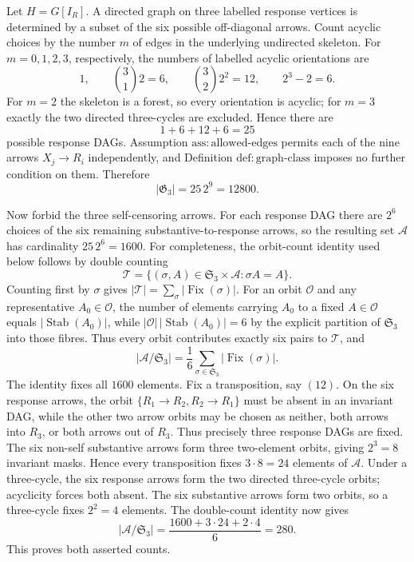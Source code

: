 Let \(H=G[I_R]\).  A directed graph on three labelled response vertices is determined by a subset of the six possible off-diagonal arrows.  Count acyclic choices by the number \(m\) of edges in the underlying undirected skeleton.  For \(m=0,1,2,3\), respectively, the numbers of labelled acyclic orientations are
\[
1,\qquad {3\choose1}2=6,\qquad {3\choose2}2^2=12,\qquad 2^3-2=6.
\]
For \(m=2\) the skeleton is a forest, so every orientation is acyclic; for \(m=3\) exactly the two directed three-cycles are excluded.  Hence there are
\[
1+6+12+6=25
\]
possible response DAGs.  Assumption \(\mathrm{ass{:}allowed\text{-}edges}\) permits each of the nine arrows \(X_j\to R_i\) independently, and Definition \(\mathrm{def{:}graph\text{-}class}\) imposes no further condition on them.  Therefore
\[
|\mathfrak G_3|=25\,2^9=12800.
\]

Now forbid the three self-censoring arrows.  For each response DAG there are \(2^6\) choices of the six remaining substantive-to-response arrows, so the resulting set \(\mathcal A\) has cardinality \(25\,2^6=1600\).  For completeness, the orbit-count identity used below follows by double counting
\[
\mathcal T=\{(\sigma,A)\in\mathfrak S_3\times\mathcal A:\sigma A=A\}.
\]
Counting first by \(\sigma\) gives \(|\mathcal T|=\sum_\sigma|\operatorname{Fix}(\sigma)|\).  For an orbit \(\mathcal O\) and any representative \(A_0\in\mathcal O\), the number of elements carrying \(A_0\) to a fixed \(A\in\mathcal O\) equals \(|\operatorname{Stab}(A_0)|\), while \(|\mathcal O|\,|\operatorname{Stab}(A_0)|=6\) by the explicit partition of \(\mathfrak S_3\) into those fibres.  Thus every orbit contributes exactly six pairs to \(\mathcal T\), and
\[
|\mathcal A/\mathfrak S_3|=\frac16\sum_{\sigma\in\mathfrak S_3}|\operatorname{Fix}(\sigma)|.
\]
The identity fixes all \(1600\) elements.  Fix a transposition, say \((12)\).  On the six response arrows, the orbit \(\{R_1\to R_2,R_2\to R_1\}\) must be absent in an invariant DAG, while the other two arrow orbits may be chosen as neither, both arrows into \(R_3\), or both arrows out of \(R_3\).  Thus precisely three response DAGs are fixed.  The six non-self substantive arrows form three two-element orbits, giving \(2^3=8\) invariant masks.  Hence every transposition fixes \(3\cdot8=24\) elements of \(\mathcal A\).  Under a three-cycle, the six response arrows form the two directed three-cycle orbits; acyclicity forces both absent.  The six substantive arrows form two orbits, so a three-cycle fixes \(2^2=4\) elements.  The double-count identity now gives
\[
|\mathcal A/\mathfrak S_3|
=\frac{1600+3\cdot24+2\cdot4}{6}
=280.
\]
This proves both asserted counts.